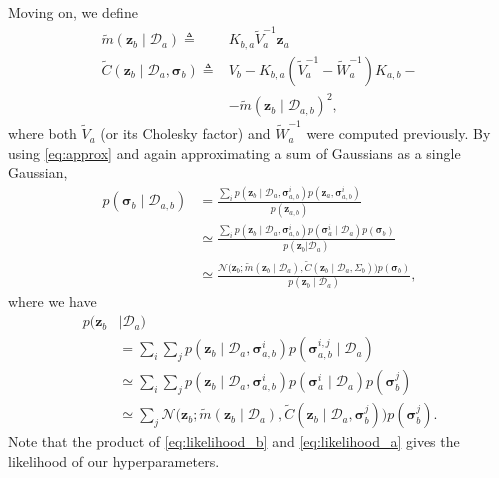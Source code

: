 \documentclass{article}
\newcommand{\given}{\ensuremath{\mid}}
\newcommand{\cm}[1]{\ensuremath{\mathcal{#1}}}
\newcommand{\bm}[1]{\ensuremath{\mathbf{#1}}}
\newcommand{\data}{\ensuremath{\cm{D}}}
\newcommand{\vect}[1]{\bm{#1}}
\newcommand{\vz}{\vect{z}}
\newcommand{\vs}{\vect{\sigma}}
\newcommand{\amean}[2]{\tilde{{m}}(#1 \given #2 )}
\newcommand{\acov}[2]{\tilde{{C}}(#1 \given #2 )}
\newcommand{\p}[2]{p(#1 \given #2 )}
\newcommand{\fPr}{p}
\newcommand{\Prob}[2]{\fPr(#1 \given #2 )}
\newcommand{\ps}[2]{p(#1\vert#2)}
\newcommand{\defequal}{\triangleq}
\begin{document}
Moving on, we define
\begin{align*}
\amean{\vz_b}{\data_a} \defequal {} &
K_{b,a} \tilde{V}_a^{-1} \vz_a \label{eq;ameanba}
\\
\acov{\vz_b}{\data_{a},\vs_b}
\defequal {} & V_b - K_{b,a}(\tilde{V}_a^{-1}-\tilde{W}_a^{-1})K_{a,b} - {} \nonumber\\
& - \amean{\vz_b}{\data_{a,b}}^2, \label{eq;acovba}
\end{align*}
where both $\tilde{V}_a$ (or its Cholesky factor) and
$\tilde{W}_a^{-1}$ were computed previously. By using
\eqref{eq:approx} and again approximating a sum of Gaussians as a
single Gaussian,
\begin{align*}
\Prob{\vs_b}{\data_{a,b}} & = \frac{\sum_i \p{\vz_b}{\data_a,\vs^i_{a,b}}p(\vz_a,\vs^i_{a,b})}{p(\vz_{a,b})}\nonumber\\
& \simeq \frac{\sum_i \p{\vz_b}{\data_a,\vs^i_{a,b}}\fPr(\vs_a^i\mid{\data_a})\fPr(\vs_{b})}{\ps{\vz_{b}}{\data_a}}\nonumber\\
& \simeq \frac{\cm{N}\bigl(\vz_b; \amean{\vz_b}{\data_a}, \acov{\vz_b}{\data_a, \Sigma_b}\bigr) \fPr(\vs_b)}{\p{\vz_{b}}{\data_a}},\label{eq:psb}
\end{align*}
where we have
\begin{align}
p(\vz_{b} &\given \data_a)\nonumber\\
& = \sum_i \sum_j \p{\vz_b}{\data_a,\vs^i_{a,b}}\Prob{\vs^{i,j}_{a,b}}{\data_a}\nonumber\\
& \simeq \sum_i \sum_j \p{\vz_b}{\data_a,\vs^i_{a,b}}\Prob{\vs_a^i}{\data_a}\fPr(\vs_{b}^j)\nonumber\\
& \simeq \sum_j \cm{N}\bigl(\vz_b; \amean{\vz_b}{\data_a}, \acov{\vz_b}{\data_a, \vs_b^j}\bigr) \fPr(\vs_b^j).\label{eq:likelihood_b}
\end{align}
Note that the product of \eqref{eq:likelihood_b} and
\eqref{eq:likelihood_a} gives the likelihood of our hyperparameters.
\end{document}
